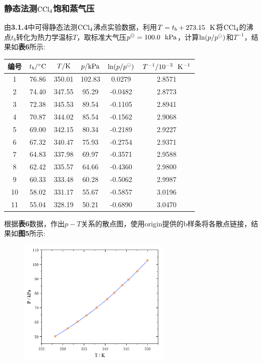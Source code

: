 \documentclass[12pt]{article}
\begin{document}
		\subsubsection{静态法测$\rm CCl_{4}$饱和蒸气压}
		由\textbf{3.1.4}中可得静态法测$\rm CCl_{4}$沸点实验数据，利用$T=t_{b}+273.15\ \ {\rm K}$将$\rm CCl_{4}$的沸点$t_{b}$转化为热力学温标$T$，取标准大气压$p^{\ominus}=100.0\ \ {\rm kPa}$，计算${\rm ln}(p/p^{\ominus})$和$T^{-1}$，结果如\textbf{表6}所示:
		\begin{table}[h]
			\centering
			\begin{tabular}{cccccc}
				\toprule
				编号 & $t_{b}/{\rm ^{\circ}C}$& $T/{\rm K}$ & $p/{\rm kPa}$ & ${\rm ln}(p/p^{\ominus})$ & $T^{-1}/{\rm 10^{-3}\ \ K^{-1}}$\\
				\midrule
				1  & 76.86 & 350.01 & 102.83 & 0.0279  & 2.8571 \\
				2  & 74.40 & 347.55 & 95.29  & -0.0482 & 2.8773 \\
				3  & 72.38 & 345.53 & 89.54  & -0.1105 & 2.8941 \\
				4  & 70.87 & 344.02 & 85.54  & -0.1562 & 2.9068 \\
				5  & 69.00 & 342.15 & 80.34  & -0.2189 & 2.9227 \\
				6  & 67.32 & 340.47 & 75.93  & -0.2754 & 2.9371 \\
				7  & 64.83 & 337.98 & 69.97  & -0.3571 & 2.9588 \\
				8  & 62.42 & 335.57 & 64.66  & -0.4360 & 2.9800 \\
				9  & 60.33 & 333.48 & 60.28  & -0.5062 & 2.9987 \\
				10 & 58.02 & 331.17 & 55.67  & -0.5857 & 3.0196 \\
				11 & 55.04 & 328.19 & 50.21  & -0.6890 & 3.0470 \\
				\bottomrule
			\end{tabular}
		\end{table}
		\par
		根据\textbf{表6}数据，作出$p-T$关系的散点图，使用origin提供的b样条将各散点链接，结果如\textbf{图5}所示:
		\begin{figure}[!h]
			\centering
			\includegraphics[width=0.65\textwidth]{5.png}
		\end{figure}
\end{document}
